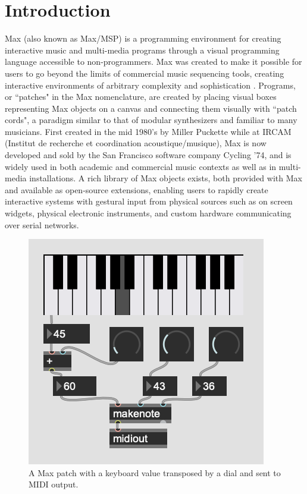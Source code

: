 \documentclass[acmsmall, anonymous, review]{acmart}
\begin{document}

\maketitle

\section{Introduction}

Max (also known as Max/MSP) is a programming environment for creating interactive 
music and multi-media programs through a visual programming language accessible 
to non-programmers. Max was created to make it possible for users
to go beyond the limits of commercial music sequencing tools, creating
interactive environments of arbitrary complexity and sophistication
\cite{Zicarelli2002}.
Programs, or ``patches" in the Max nomenclature, are created by placing
visual boxes representing Max objects on a canvas and connecting them visually with
``patch cords", a paradigm similar to that of modular synthesizers and familiar to many musicians.
First created in the mid 1980's by Miller Puckette while at IRCAM 
(Institut de recherche et coordination acoustique/musique), 
Max is now developed and sold by the San Francisco software company Cycling '74,
and is widely used in both academic and commercial music contexts as well
as in multi-media installations. A rich library of Max objects exists, 
both provided with Max and available as open-source 
extensions, enabling users to rapidly create interactive systems with gestural 
input from physical sources such as on screen widgets, physical electronic instruments,
and custom hardware communicating over serial networks.

\begin{figure}[h]
  \centering
  \includegraphics[width=.5\linewidth]{fig-1}
  \caption{A Max patch with a keyboard value transposed by a dial and sent to MIDI output.}
  \Description{}
\end{figure}
\end{document}
